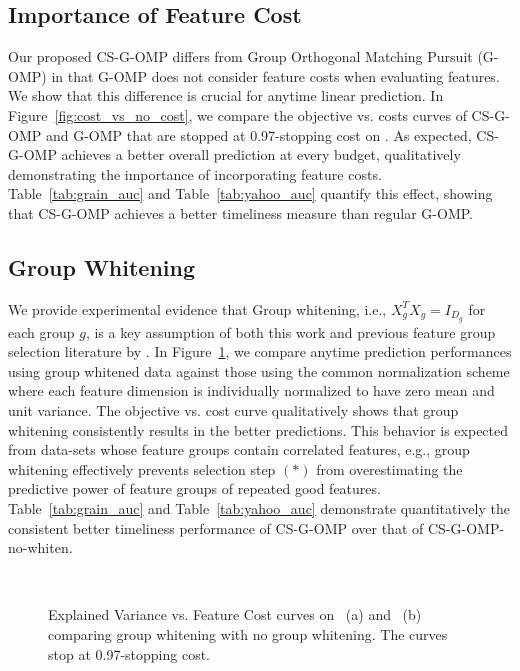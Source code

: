 \subsection{Importance of Feature Cost}
Our proposed CS-G-OMP differs from Group Orthogonal Matching Pursuit (G-OMP) \citep{gomp} in that G-OMP does not consider feature costs when evaluating features. We show that this difference is crucial for anytime linear prediction. In Figure~\ref{fig:cost_vs_no_cost}, we compare the objective vs. costs curves of CS-G-OMP and G-OMP that are stopped at 0.97-stopping cost on \YahooLTR. As expected, CS-G-OMP achieves a
better overall prediction at every budget, qualitatively demonstrating the importance of incorporating feature costs. Table~\ref{tab:grain_auc} and Table~\ref{tab:yahoo_auc} 
quantify this effect, showing that CS-G-OMP 
achieves a better timeliness
measure than regular G-OMP. 

\subsection{Group Whitening}
We provide experimental evidence that  
Group whitening, i.e., $X_g^TX_g = I_{D_g}$ for each group $g$, is a key assumption of both this work and previous feature group selection literature  by \cite{gomp, log_gomp}.
In Figure~\ref{fig:whiten_vs_no_whiten}, we compare 
anytime prediction performances using group whitened data 
against those using the common  
normalization scheme where each feature dimension
is individually normalized to have zero mean and unit variance. 
The objective vs. cost curve qualitatively shows that group whitening consistently results in the better predictions.
This behavior is expected from data-sets whose feature groups contain correlated features, e.g., group whitening effectively prevents selection step $(*)$ from overestimating the predictive power of feature groups of repeated good features. Table~\ref{tab:grain_auc} and Table~\ref{tab:yahoo_auc} demonstrate quantitatively the consistent better timeliness performance of CS-G-OMP over that of CS-G-OMP-no-whiten. 


\begin{figure}[ht!]
\centering
{}
~
\caption{Explained Variance vs. Feature Cost curves on \Grain\, (a) and \YahooLTR\, (b)  comparing group whitening with no group whitening. The curves stop at 0.97-stopping cost.}
\label{fig:whiten_vs_no_whiten}
\end{figure}


